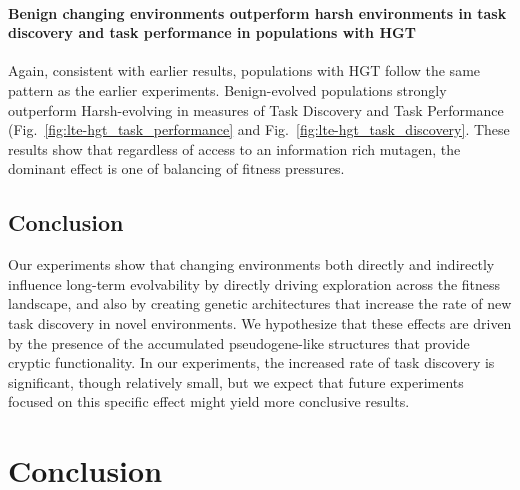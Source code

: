 \documentclass[PhD]{msu-thesis}
\begin{document}
\subsubsection{Benign changing environments outperform harsh environments in task discovery and task performance in populations with HGT}
Again, consistent with earlier results, populations with HGT follow the same pattern as the earlier experiments. Benign-evolved populations strongly outperform Harsh-evolving in measures of Task Discovery and Task Performance (Fig.~\ref{fig:lte-hgt_task_performance} and Fig.~\ref{fig:lte-hgt_task_discovery}. These results show that regardless of access to an information rich mutagen, the dominant effect is one of balancing of fitness pressures. 



\section{Conclusion}

Our experiments show that changing environments both directly and indirectly influence long-term evolvability by directly driving exploration across the fitness landscape, and also by creating genetic architectures that increase the rate of new task discovery in novel environments. We hypothesize that these effects are driven by the presence of the accumulated pseudogene-like structures that provide cryptic functionality. In our experiments, the increased rate of task discovery is significant, though relatively small, but we expect that future experiments focused on this specific effect might yield more conclusive results. 






\chapter{Conclusion}
\label{chap:conclusion}
\end{document}
